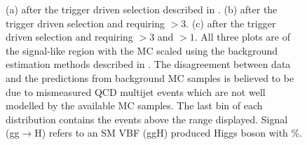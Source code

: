 \begin{figure}
  \caption{(a) \METsig after the trigger driven selection described in . (b) \jetmetdphi after the trigger driven selection and requiring \METsig$>3$. (c) \Mjj after the trigger driven selection and requiring \METsig$>3$ and \jetmetdphi$>1$. All three plots are of the signal-like region with the \ac{MC} scaled using the background estimation methods described in . The disagreement between data and the predictions from background \ac{MC} samples is believed to be due to mismeasured \ac{QCD} multijet events which are not well modelled by the available \ac{MC} samples. The last bin of each distribution contains the events above the range displayed. Signal (gg$\rightarrow$H) refers to an \ac{SM} \ac{VBF} (\ac{ggH}) produced Higgs boson with \%.}
  \label{fig:parkedpresel}
\end{figure}


